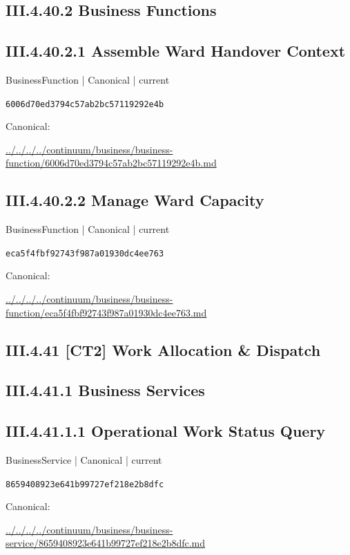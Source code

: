 \documentclass[10pt,a4paper]{article}
\begin{document}
\subsection*{III.4.40.2 Business Functions}
\subsection*{III.4.40.2.1 Assemble Ward Handover Context}
{\small BusinessFunction | Canonical | current}\par
\texttt{6006d70ed3794c57ab2bc57119292e4b}\par
Canonical: \par
{\footnotesize\url{../../../../continuum/business/business-function/6006d70ed3794c57ab2bc57119292e4b.md}}\par
\subsection*{III.4.40.2.2 Manage Ward Capacity}
{\small BusinessFunction | Canonical | current}\par
\texttt{eca5f4fbf92743f987a01930dc4ee763}\par
Canonical: \par
{\footnotesize\url{../../../../continuum/business/business-function/eca5f4fbf92743f987a01930dc4ee763.md}}\par
\subsection*{III.4.41 [CT2] Work Allocation \& Dispatch}
\subsection*{III.4.41.1 Business Services}
\subsection*{III.4.41.1.1 Operational Work Status Query}
{\small BusinessService | Canonical | current}\par
\texttt{8659408923e641b99727ef218e2b8dfc}\par
Canonical: \par
{\footnotesize\url{../../../../continuum/business/business-service/8659408923e641b99727ef218e2b8dfc.md}}\par
\end{document}

